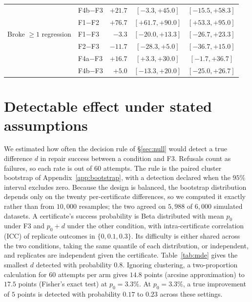 \documentclass{article}
\begin{document}
\begin{table}[h]
\begin{tabular}{@{}llrcc@{}}
                         & F4b$-$F3 & $+21.7$ & $[-3.3,+45.0]$   & $[-15.5,+58.3]$ \\
                         & F1$-$F2  & $+76.7$ & $[+61.7,+90.0]$  & $[+53.3,+95.0]$ \\
\addlinespace
Broke $\geq 1$ regression & F1$-$F3  & $-3.3$  & $[-20.0,+13.3]$ & $[-26.7,+23.3]$ \\
                          & F2$-$F3  & $-11.7$ & $[-28.3,+5.0]$  & $[-36.7,+15.0]$ \\
                          & F4a$-$F3 & $+16.7$ & $[+3.3,+30.0]$  & $[-1.7,+36.7]$ \\
                          & F4b$-$F3 & $+5.0$  & $[-13.3,+20.0]$ & $[-25.0,+26.7]$ \\
\bottomrule
\end{tabular}
\end{table}

\section{Detectable effect under stated assumptions}
\label{app:mde}

We estimated how often the decision rule of \S\ref{sec:null} would detect a true
difference $d$ in repair success between a condition and F3. Refusals count as
failures, so each rate is out of $60$ attempts. The rule is the paired cluster
bootstrap of Appendix~\ref{app:bootstrap}, with a detection declared when the
$95\%$ interval excludes zero. Because the design is balanced, the bootstrap
distribution depends only on the twenty per-certificate differences, so we
computed it exactly rather than from $10{,}000$ resamples; the two agreed on
$5{,}988$ of $6{,}000$ simulated datasets. A certificate's success probability is
Beta distributed with mean $p_0$ under F3 and $p_0+d$ under the other condition,
with intra-certificate correlation (ICC) of replicate outcomes in
$\{0, 0.1, 0.3\}$. Its difficulty is either shared across the two conditions,
taking the same quantile of each distribution, or independent, and replicates
are independent given the certificate. Table~\ref{tab:mde} gives the smallest
$d$ detected with probability $0.8$. Ignoring clustering, a two-proportion
calculation for $60$ attempts per arm gives $14.8$ points (arcsine
approximation) to $17.5$ points (Fisher's exact test) at $p_0=3.3\%$. At
$p_0=3.3\%$, a true improvement of $5$ points is detected with probability
$0.17$ to $0.23$ across these settings.
\end{document}

